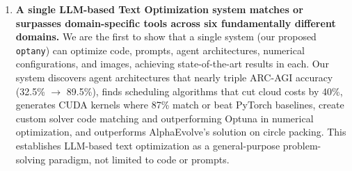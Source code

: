 \documentclass[sigconf,anonymous,review]{acmart}
\newcommand{\oa}{\texttt{optany}}
\begin{document}
\begin{enumerate}[leftmargin=*,itemsep=2pt]
\item \textbf{A single LLM-based Text Optimization system matches or surpasses domain-specific tools across six fundamentally different domains.} We are the first to show that a single system (our proposed \oa{}) can optimize code, prompts, agent architectures, numerical configurations, and images, achieving state-of-the-art results in each. Our system discovers agent architectures that nearly triple ARC-AGI accuracy (32.5\% $\to$ 89.5\%), finds scheduling algorithms that cut cloud costs by 40\%, generates CUDA kernels where 87\% match or beat PyTorch baselines, create custom solver code matching and outperforming Optuna in numerical optimization, and outperforms AlphaEvolve's solution on circle packing. This establishes LLM-based text optimization as a general-purpose problem-solving paradigm, not limited to code or prompts.


\end{enumerate}
\end{document}
